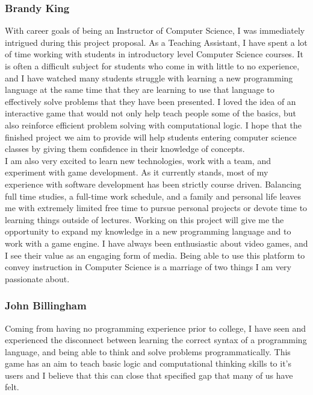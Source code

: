 \subsubsection{Brandy King}
With career goals of being an Instructor of Computer Science, I was immediately
intrigued during this project proposal. As a Teaching Assistant, I have spent a
lot of time working with students in introductory level Computer Science
courses. It is often a difficult subject for students who come in with little to
no experience, and I have watched many students struggle with learning a new
programming language at the same time that they are learning to use that
language to effectively solve problems that they have been presented. I loved
the idea of an interactive game that would not only help teach people some of
the basics, but also reinforce efficient problem solving with computational
logic. I hope that the finished project we aim to provide will help students
entering computer science classes by giving them confidence in their knowledge
of concepts.\\

I am also very excited to learn new technologies, work with a team, and
experiment with game development. As it currently stands, most of my experience
with software development has been strictly course driven. Balancing full time
studies, a full-time work schedule, and a family and personal life leaves me
with extremely limited free time to pursue personal projects or devote time to
learning things outside of lectures. Working on this project will give me the
opportunity to expand my knowledge in a new programming language and to work
with a game engine. I have always been enthusiastic about video games, and I see
their value as an engaging form of media. Being able to use this platform to
convey instruction in Computer Science is a marriage of two things I am very
passionate about.

\subsubsection{John Billingham}
Coming from having no programming experience prior to college, I have seen and
experienced the disconnect between learning the correct syntax of a programming
language, and being able to think and solve problems programmatically. This game
has an aim to teach basic logic and computational thinking skills to it’s users
and I believe that this can close that specified gap that many of us have felt.

